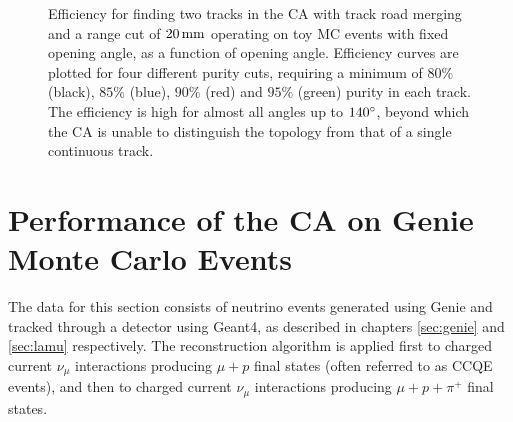 \begin{figure}
\centering
{}
\caption[Efficiency for finding 2 tracks for CA with merging and range cut operating on toy MC events]{\label{fig:ca_toy_rcut_twotrack_efficiency}Efficiency for finding two tracks in the \ac{CA} with track road merging and a range cut of $20\,\mathrm{mm}$ operating on toy MC events with fixed opening angle, as a function of opening angle. Efficiency curves are plotted for four different purity cuts, requiring a minimum of $80\%$ (black), $85\%$ (blue), $90\%$ (red) and $95\%$ (green) purity in each track. The efficiency is high for almost all angles up to $140^\circ$, beyond which the \ac{CA} is unable to distinguish the topology from that of a single continuous track.}
\end{figure}


\clearpage
\section{Performance of the \acl{CA} on Genie Monte Carlo Events}
The data for this section consists of neutrino events generated using Genie and tracked through a detector using Geant4, as described in chapters \ref{sec:genie} and \ref{sec:lamu} respectively. The reconstruction algorithm is applied first to charged current $\nu_\mu$ interactions producing $\mu + p$ final states (often referred to as \acl{CCQE} events), and then to charged current $\nu_\mu$ interactions producing $\mu + p + \pi^+$ final states.

